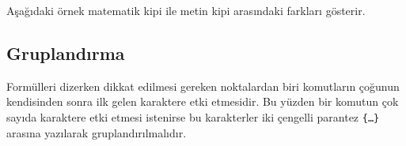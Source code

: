 \documentclass[
  letterpaper,
  DIV=11,
  numbers=noendperiod]{scrreprt}
\newenvironment{Shaded}{\begin{snugshade}}{\end{snugshade}}
\newcommand{\BuiltInTok}[1]{\textcolor[rgb]{0.00,0.23,0.31}{#1}}
\newcommand{\ExtensionTok}[1]{\textcolor[rgb]{0.00,0.23,0.31}{#1}}
\newcommand{\KeywordTok}[1]{\textcolor[rgb]{0.00,0.23,0.31}{#1}}
\newcommand{\NormalTok}[1]{\textcolor[rgb]{0.00,0.23,0.31}{#1}}
\newcommand{\SpecialCharTok}[1]{\textcolor[rgb]{0.37,0.37,0.37}{#1}}
\newcommand{\SpecialStringTok}[1]{\textcolor[rgb]{0.13,0.47,0.30}{#1}}
\begin{document}
Aşağıdaki örnek matematik kipi ile metin kipi arasındaki farkları
gösterir.

\begin{Shaded}
\end{Shaded}

\hypertarget{gruplandux131rma}{%
\subsection{Gruplandırma}\label{gruplandux131rma}}

Formülleri dizerken dikkat edilmesi gereken noktalardan biri komutların
çoğunun kendisinden sonra ilk gelen karaktere etki etmesidir. Bu yüzden
bir komutun çok sayıda karaktere etki etmesi istenirse bu karakterler
iki çengelli parantez \texttt{\{…\}} arasına yazılarak
gruplandırılmalıdır.

\begin{Shaded}
\end{Shaded}
\end{document}

